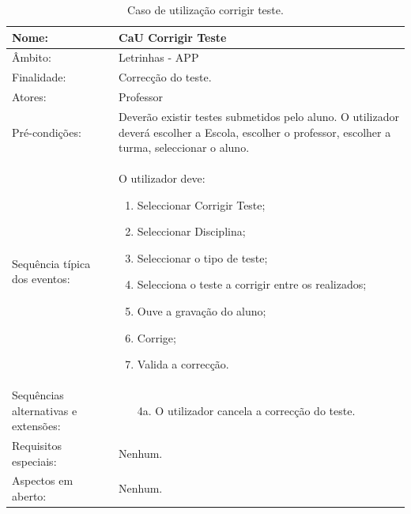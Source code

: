 \documentclass[a4paper]{article}
\begin{document}
				\newpage
				\begin {table}[h]
				\begin{tabular}{|p{2cm} p{10cm}|}
					\hline Nome: & CaU Corrigir Teste \\ 
					\hline Âmbito: & Letrinhas - APP \\ 
					\hline Finalidade: & Correcção do teste. \\ 
					\hline Atores: & Professor \\ 
				    \hline Pré-condições: & Deverão existir testes submetidos pelo  aluno.
					O utilizador deverá escolher a  Escola, escolher o professor, escolher a turma, seleccionar o aluno. \\ 
				    \hline Sequência típica dos eventos: &  					
					O utilizador deve:
				    \begin{enumerate}
				    	\item	Seleccionar Corrigir Teste;
						\item	Seleccionar Disciplina;
						\item	Seleccionar o tipo de teste;
						\item	Selecciona o teste a corrigir entre os realizados;
						\item	Ouve a gravação do aluno;
						\item	Corrige;
						\item	Valida a correcção.
				    \end{enumerate} \\ 
  				    \hline Sequências alternativas e extensões: & 
  				    \begin{enumerate}			    	
  				    	\item[4a.] O utilizador cancela a correcção do teste.
  				    \end{enumerate}
  				     \\ 
  				    \hline Requisitos especiais: & Nenhum.\\ 
  				    \hline Aspectos em aberto: & Nenhum. \\
					\hline 
				\end{tabular}
				\caption{Caso de utilização corrigir teste.}
			\end{table} 
			
		\newpage				
	
	








	
	\newpage
		
\end{document}
